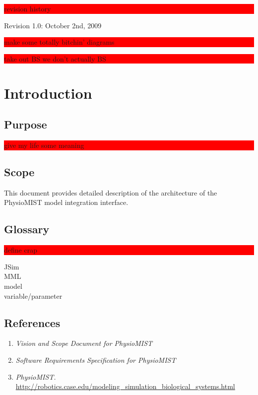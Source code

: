\documentclass{article}
\title{\todo{PhysioMIST Design Crap}}
\author{Mark Caral, Sara Cummins, BarbaraJoy Jones, Joshua Lee}
\date{October 23, 2009\\{\sc Eecs} 393}
\newcommand{\todo}[1]{\colorbox{red}{\begin{minipage}{\textwidth}{#1}\end{minipage}}}
\begin{document}
\begin{titlepage}
\maketitle\thispagestyle{empty}
\end{titlepage}

\todo{revision history}
Revision 1.0: October 2nd, 2009
\newpage

\tableofcontents
\newpage

\todo{make some totally bitchin' diagrams}
\todo{take out BS we don't actually BS}

\section{Introduction}
\subsection{Purpose}
\todo{give my life some meaning}
\subsection{Scope}
This document provides detailed description of the architecture of the PhysioMIST model integration interface.
\subsection{Glossary}
\todo{define crap}
JSim\\
MML\\
model\\
variable/parameter
\subsection{References}
\begin{enumerate}
\item \emph{Vision and Scope Document for PhysioMIST}
\item \emph{Software Requirements Specification for PhysioMIST}
\item \emph{PhysioMIST.} \url{http://robotics.case.edu/modeling_simulation_biological_systems.html}
\end{enumerate}
\end{document}
